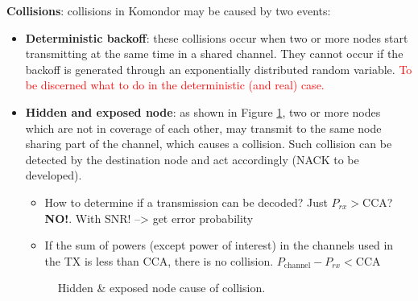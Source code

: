 \documentclass[a4paper]{article}
\begin{document}
\textbf{Collisions}: collisions in Komondor may be caused by two events:
	\begin{itemize}
	\item \textbf{Deterministic backoff}: these collisions occur when two or more nodes start transmitting at the same time in a shared channel. They cannot occur if the backoff is generated through an exponentially distributed random variable. \textcolor{red}{To be discerned what to do in the deterministic (and real) case.}
    \item \textbf{Hidden and exposed node}: as shown in Figure \ref{fig:collisions_hidden_node}, two or more nodes which are not in coverage of each other, may transmit to the same node sharing part of the channel, which causes a collision. Such collision can be detected by the destination node and act accordingly (NACK to be developed).
    	\begin{itemize}
    	\item How to determine if a transmission can be decoded? Just $P_{rx}>\text{CCA}$? \textbf{NO!}. With SNR! --> get error probability
        \item If the sum of powers (except power of interest) in the channels used in the TX is less than CCA, there is no collision. $P_\text{channel} - P_{rx} < \text{CCA}$
    	\end{itemize}
    
    \begin{figure}
      \centering
      \caption{Hidden \& exposed node cause of collision.} \label{fig:collisions_hidden_node}
      \end{figure}
	\end{itemize}
\end{document}
